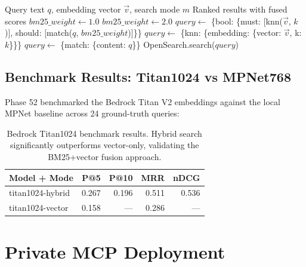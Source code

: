 \documentclass[11pt,letterpaper]{article}
\begin{document}
\begin{algorithm}[H]
\caption{Hybrid Search with Code Identifier Detection}
\label{alg:hybrid-search}
\begin{algorithmic}[1]
\REQUIRE Query text $q$, embedding vector $\vec{v}$, search mode $m$
\ENSURE Ranked results with fused scores
    \STATE $bm25\_weight \gets 1.0$
        \STATE $bm25\_weight \gets 2.0$ 
    \ENDIF
    \STATE $query \gets$ \{bool: \{must: [knn($\vec{v}$, $k$)], should: [match($q$, $bm25\_weight$)]\}\}
    \STATE $query \gets$ \{knn: \{embedding: \{vector: $\vec{v}$, k: $k$\}\}\}
    \STATE $query \gets$ \{match: \{content: $q$\}\}
\ENDIF
\RETURN OpenSearch.search($query$)
\end{algorithmic}
\end{algorithm}

\subsection{Benchmark Results: Titan1024 vs MPNet768}

Phase 52 benchmarked the Bedrock Titan V2 embeddings against the local
MPNet baseline across 24 ground-truth queries:

\begin{table}[H]
\centering
\footnotesize
\begin{tabular}{@{}lrrrr@{}}
\toprule
\textbf{Model + Mode} & \textbf{P@5} & \textbf{P@10} & \textbf{MRR} & \textbf{nDCG} \\
\midrule
titan1024-hybrid & 0.267 & 0.196 & 0.511 & 0.536 \\
titan1024-vector & 0.158 & --- & 0.286 & --- \\
\bottomrule
\end{tabular}
\caption{Bedrock Titan1024 benchmark results. Hybrid search significantly
outperforms vector-only, validating the BM25+vector fusion approach.}
\label{tab:benchmark}
\end{table}

\section{Private MCP Deployment}
\label{sec:private}
\end{document}
